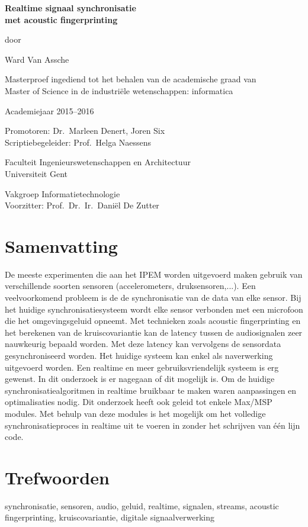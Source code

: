 
\newpage

{
\setlength{\baselineskip}{14pt}
\setlength{\parindent}{0pt}
\setlength{\parskip}{8pt}

\begin{center}

\noindent \textbf{\huge
Realtime signaal synchronisatie\\[8pt]
met acoustic fingerprinting
}

door 

Ward Van Assche

Masterproef ingediend tot het behalen van de academische graad van\\
Master of Science in de industriële wetenschappen: informatica

Academiejaar 2015--2016

Promotoren: Dr.~Marleen Denert, Joren Six\\
Scriptiebegeleider: Prof.~Helga Naessens

Faculteit Ingenieurswetenschappen en Architectuur\\
Universiteit Gent

Vakgroep Informatietechnologie\\
Voorzitter: Prof.~Dr.~Ir.~Dani\"{e}l De Zutter


\end{center}

\section*{Samenvatting}


De meeste experimenten die aan het IPEM worden uitgevoerd maken gebruik van verschillende soorten sensoren (accelerometers, druksensoren,...). Een veelvoorkomend probleem is de de synchronisatie van de data van elke sensor. Bij het huidige synchronisatiesysteem wordt elke sensor verbonden met een microfoon die het omgevingsgeluid opneemt. Met technieken zoals acoustic fingerprinting en het berekenen van de kruiscovariantie kan de latency tussen de audiosignalen zeer nauwkeurig bepaald worden. Met deze latency kan vervolgens de sensordata gesynchroniseerd worden. Het huidige systeem kan enkel als naverwerking uitgevoerd worden. Een realtime en meer gebruiksvriendelijk systeem is erg gewenst. In dit onderzoek is er nagegaan of dit mogelijk is. Om de huidige synchronisatiealgoritmen in realtime bruikbaar te maken waren aanpassingen en optimalisaties nodig. Dit onderzoek heeft ook geleid tot enkele Max/MSP modules. Met behulp van deze modules is het mogelijk om het volledige synchronisatieproces in realtime uit te voeren in zonder het schrijven van één lijn code.


\section*{Trefwoorden}


synchronisatie, sensoren, audio, geluid, realtime, signalen, streams, acoustic fingerprinting, kruiscovariantie, digitale signaalverwerking

}
\newpage %
